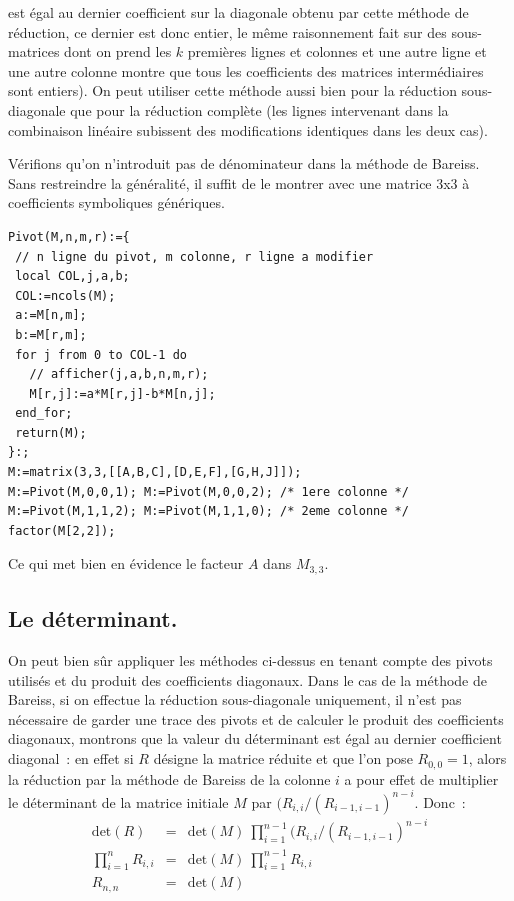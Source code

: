 \documentclass[a4paper,11pt]{book}
\begin{document}
\begin{giacjshere}
\begin{itemize}
est \'egal au dernier coefficient sur la diagonale obtenu par
cette m\'ethode de r\'eduction, ce dernier est donc entier, le
m\^eme raisonnement fait sur des sous-matrices dont on prend les
$k$ premi\`eres lignes et colonnes et une autre ligne et une autre
colonne montre que tous les coefficients des matrices interm\'ediaires
sont entiers).
On peut utiliser cette méthode aussi bien pour la réduction
sous-diagonale que pour la réduction complète (les lignes
intervenant dans la combinaison linéaire subissent des 
modifications identiques dans les deux cas).
\end{itemize}
V\'erifions
qu'on n'introduit pas de dénominateur dans la méthode
de Bareiss. Sans
restreindre la généralité, il suffit de le montrer avec une
matrice 3x3 \`a coefficients symboliques génériques. 
\begin{verbatim}
Pivot(M,n,m,r):={ 
 // n ligne du pivot, m colonne, r ligne a modifier
 local COL,j,a,b; 
 COL:=ncols(M);
 a:=M[n,m];
 b:=M[r,m];
 for j from 0 to COL-1 do
   // afficher(j,a,b,n,m,r);
   M[r,j]:=a*M[r,j]-b*M[n,j];
 end_for;
 return(M);
}:; 
M:=matrix(3,3,[[A,B,C],[D,E,F],[G,H,J]]);
M:=Pivot(M,0,0,1); M:=Pivot(M,0,0,2); /* 1ere colonne */
M:=Pivot(M,1,1,2); M:=Pivot(M,1,1,0); /* 2eme colonne */
factor(M[2,2]);
\end{verbatim}
Ce qui met bien en évidence le facteur $A$ dans $M_{3,3}$.

\subsection{Le d\'eterminant.}
On peut bien sûr appliquer les m\'ethodes ci-dessus en tenant compte
des pivots utilisés et du produit des coefficients diagonaux. Dans le cas de 
la méthode de Bareiss, si on effectue la réduction sous-diagonale
uniquement, il n'est pas nécessaire de garder une trace des pivots
et de calculer le produit des coefficients diagonaux,
montrons que la valeur du d\'eterminant est égal au 
dernier coefficient diagonal~: en effet si $R$ désigne la matrice réduite et
que l'on pose $R_{0,0}=1$, alors la réduction par la méthode de
Bareiss de la colonne $i$ a pour effet de multiplier le déterminant 
de la matrice initiale $M$ par $(R_{i,i}/(R_{i-1,i-1})^{n-i}$. Donc~:
\begin{eqnarray*}
 \mbox{det}(R)&=&\mbox{det}(M) \ \prod_{i=1}^{n-1}
(R_{i,i}/(R_{i-1,i-1})^{n-i} \\
\prod_{i=1}^{n} R_{i,i}&=& \mbox{det}(M) \ \prod_{i=1}^{n-1} R_{i,i}  \\
R_{n,n} &=& \mbox{det}(M)
\end{eqnarray*}



\end{giacjshere}
\end{document}
